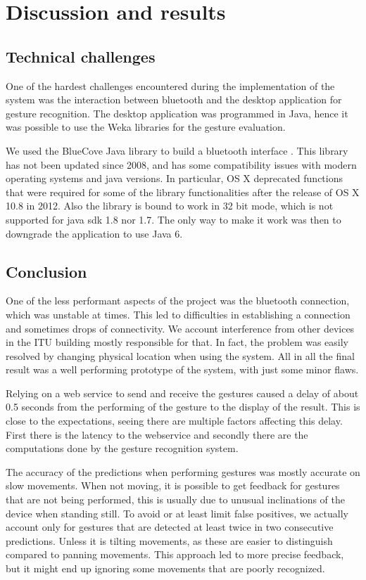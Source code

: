 \section{Discussion and results}

\subsection{Technical challenges}
One of the hardest challenges encountered during the implementation of the system was the interaction between bluetooth and the desktop application for gesture recognition.
The desktop application was programmed in Java, hence it was possible to use the Weka libraries for the gesture evaluation.

We used the BlueCove Java library to build a bluetooth interface \cite{bluecove}.
This library has not been updated since 2008, and has some compatibility issues with modern operating systems and java versions.
In particular, OS X deprecated functions that were required for some of the library functionalities after the release of OS X 10.8 in 2012.
Also the library is bound to work in 32 bit mode, which is not supported for java sdk 1.8 nor 1.7.
The only way to make it work was then to downgrade the application to use Java 6.

\subsection{Conclusion}
One of the less performant aspects of the project was the bluetooth connection, which was unstable at times. 
This led to difficulties in establishing a connection and sometimes drops of connectivity.
We account interference from other devices in the ITU building mostly responsible for that. 
In fact, the problem was easily resolved by changing physical location when using the system.
All in all the final result was a well performing prototype of the system, with just some minor flaws.

Relying on a web service to send and receive the gestures caused a delay of about 0.5 seconds from the performing of the gesture to the display of the result.
This is close to the expectations, seeing there are multiple factors affecting this delay. First there is the latency to the webservice and secondly there are the computations done by the gesture recognition system.

The accuracy of the predictions when performing gestures was mostly accurate on slow movements.
When not moving, it is possible to get feedback for gestures that are not being performed, this is usually due to unusual inclinations of the device when standing still.
To avoid or at least limit false positives, we actually account only for gestures that are detected at least twice in two consecutive predictions.
Unless it is tilting movements, as these are easier to distinguish compared to panning movements. 
This approach led to more precise feedback, but it might end up ignoring some movements that are poorly recognized.